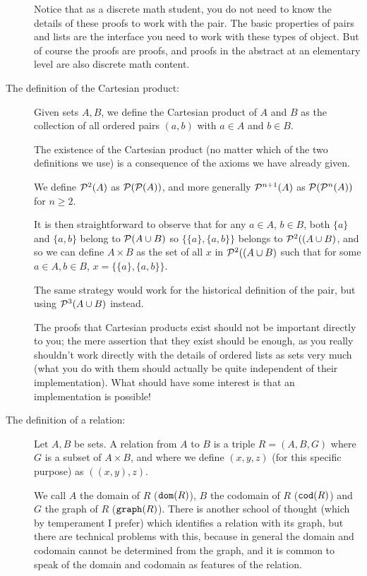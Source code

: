 \documentclass[12pt]{article}
\begin{document}
\begin{description}
Notice that as a discrete math student, you do not need to know the details of these proofs to work with the pair.  The basic properties of pairs and lists are the interface you need to work with these types of object.  But of course the proofs are proofs, and proofs in the abstract at an elementary level are also discrete math content.

\item[The definition of the Cartesian product:]

Given sets $A,B$, we define the Cartesian product of $A$ and $B$ as the collection of all ordered pairs
$(a,b)$ with $a \in A$ and $b \in B$.

The existence of the Cartesian product (no matter which of the two definitions we use) is a consequence of the axioms we have already given.

We define ${\cal P}^2(A)$ as ${\cal P}({\cal P}(A))$, and more generally ${\cal P}^{n+1}(A)$ as 
${\cal P}({\cal P}^n(A))$ for $n \geq 2$.

It is then straightforward to observe that for any $a \in A$, $b \in B$, both $\{a\}$ and $\{a,b\}$ belong to ${\cal P}(A \cup B)$ so $\{\{a\},\{a,b\}\}$ belongs to ${\cal P}^2((A \cup B)$, and so we can define $A \times B$ as the set of all $x$ in ${\cal P}^2((A \cup B)$ such that for some $a\in A, b\in B$, $x = \{\{a\},\{a,b\}\}$.

The same strategy would work for the historical definition of the pair, but using ${\cal P}^3(A \cup B)$ instead.

The proofs that Cartesian products exist should not be important directly to you;  the mere assertion that they exist should be enough, as you really shouldn't work directly with the details of ordered lists as sets very much (what you do with them should actually be quite independent of their implementation).  What should have some interest is that an implementation is possible!

\item[The definition of a relation:]

Let $A,B$ be sets.  A relation from $A$ to $B$ is a triple $R=(A,B,G)$ where $G$ is a subset of $A \times B$, and where we define $(x,y,z)$ (for this specific purpose) as $((x,y),z)$.

We call $A$ the domain of $R$ (${\tt dom}(R)$), $B$ the codomain of $R$ (${\tt cod}(R)$) and $G$ the graph of $R$ (${\tt graph}(R)$).   There is another school of thought
(which by temperament I prefer) which identifies a relation with its graph, but there are technical problems with this, because in general the domain and codomain cannot be determined from the graph, and it is common to speak of the domain and codomain as features of the relation.


\end{description}
\end{document}
